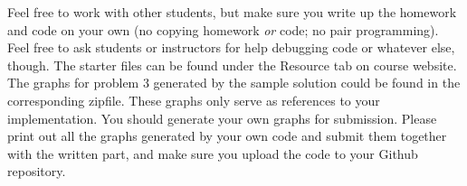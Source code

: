 \documentclass[12pt,letterpaper]{hmcpset}
\begin{document}
Feel free to work with other students, but make sure you write up the homework
and code on your own (no copying homework \textit{or} code; no pair programming).
Feel free to ask students or instructors for help debugging code or whatever else,
though.
\newline
\newline
The starter files can be found under the Resource tab on course website. The graphs for problem 3 generated by the sample solution could be found in the corresponding zipfile. These graphs only serve as references to your implementation. You should generate your own graphs for submission. Please print out all the graphs generated by your own code and submit them together with the written part, and make sure you upload the code to your Github repository.\\
\end{document}
